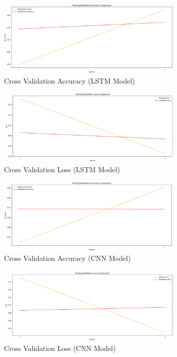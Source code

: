 \documentclass[conference]{IEEEtran}
\begin{document}
\begin{figure}[H]
    \centering
    \includegraphics[width=3.5in]{pictures/model1_accuracy.png}
    \caption{Cross Validation Accuracy (LSTM Model)}\label{fig:model1_accuracy}
\end{figure}

\begin{figure}[H]
    \centering
    \includegraphics[width=3.5in]{pictures/model1_loss.png}
    \caption{Cross Validation Loss (LSTM Model)}\label{fig:model1_loss}
\end{figure}

\begin{figure}[H]
    \centering
    \includegraphics[width=3.5in]{pictures/model2_accuracy.png}
    \caption{Cross Validation Accuracy (CNN Model)}\label{fig:model2_accuracy}
\end{figure}

\begin{figure}[H]
    \centering
    \includegraphics[width=3.5in]{pictures/model2_loss.png}
    \caption{Cross Validation Loss (CNN Model)}\label{fig:model2_loss}
\end{figure}
\end{document}
